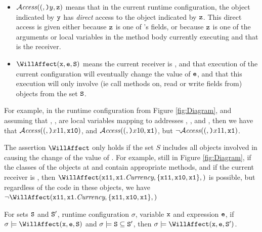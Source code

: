 \documentclass[preprint,10pt]{sigplanconf}
\begin{document}
\begin{itemize}
\item
${\mathcal{A}}\textrm{\textit{ccess}}((,{\mbox{\tt{)}}}{y},{\mbox{\tt{z}}})$  means that in the current runtime configuration, the object indicated by ${\mbox{\tt{y}}}$ has {\em direct} access to the object
indicated by  ${\mbox{\tt{z}}}$. This direct access is given either because ${\mbox{\tt{z}}}$ is one of 's fields, or because ${\mbox{\tt{z}}}$
is one of the arguments or local variables in the method body currently executing and that  is the receiver.
\item
$\WillAffect(\prg{x},\syntax{\sE},\prg{S})$
means the current receiver is , and that 
execution of the current configuration will eventually change the value of ${\mbox{\tt{{\it {{\mbox{\tt{e}}}}}}}}$, and that this execution  
will only involve (ie call methods on, read or write fields from) objects from the set ${\mbox{\tt{S}}}$.
\end{itemize}

For example, in the runtime configuration from Figure \ref{fig:Diagram}, and assuming that
, ,  are local variables mapping to addresses , , and , then  we   have that 
${\mathcal{A}}\textrm{\textit{ccess}}((,{\mbox{\tt{)}}}{x11},{\mbox{\tt{x10}}})$, and ${\mathcal{A}}\textrm{\textit{ccess}}((,{\mbox{\tt{)}}}{x10},{\mbox{\tt{x1}}})$, but $\neg {\mathcal{A}}\textrm{\textit{ccess}}((,{\mbox{\tt{)}}}{x11},{\mbox{\tt{x1}}})$.


The assertion $\WillAffect$  only holds if the set $S$ includes all objects involved in causing the
change of the value of . For example, still in Figure \ref{fig:Diagram}, if the classes of the 
objects at   and  contain appropriate methods,  and if the current receiver is , then $\WillAffect(\prg{x11}, \syntax{\prg{x1}.Currency},\{\prg{x11},\prg{x10},\prg{x1}\}, )$ is possible, but regardless of the code in these
objects, we have $\neg \WillAffect(\prg{x11}, \syntax{\prg{x1}.Currency},\{\prg{x11},\prg{x10},\prg{x1}\}, )$

\begin{lemma}
For   sets ${\mbox{\tt{S}}}$ and  ${\mbox{\tt{S}}}'$, runtime configuration $\sigma$, variable ${\mbox{\tt{x}}}$ and expression ${\mbox{\tt{e}}}$, if
$\sigma \models \WillAffect(\prg{x},\syntax{\sE},\prg{S})$ and $\sigma \models {\mbox{\tt{S}}} \subseteq {\mbox{\tt{S}}}'$, then
$\sigma \models \WillAffect(\prg{x},\syntax{\sE},\prg{S}')$.
\end{lemma}
\end{document}
